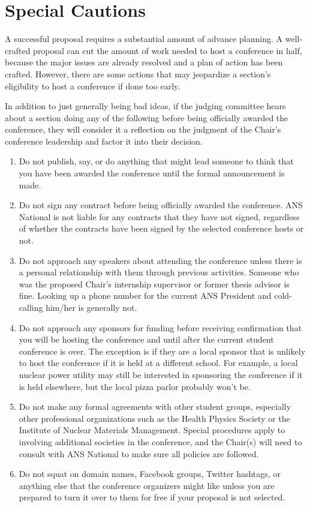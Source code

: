 \documentclass[12pt]{article}
\begin{document}
\section{Special Cautions}\label{sec:special_cautions}
A successful proposal requires a substantial amount of advance planning. A well-crafted proposal can cut the amount of work needed to host a conference in half, because the major issues are already resolved and a plan of action has been crafted. 
However, there are some actions that may jeopardize a section's eligibility to host a conference if done too early.

In addition to just generally being bad ideas, if the judging committee hears about a section doing any of the following before being officially awarded the conference, they will consider it a reflection on the judgment of the Chair's conference leadership and factor it into their decision.

\begin{enumerate}
\item{Do not publish, say, or do anything that might lead someone to think that you have been awarded the conference until the formal announcement is made.}
\item{Do not sign any contract before being officially awarded the conference. ANS National is not liable for any contracts that they have not signed, regardless of whether the contracts have been signed by the selected conference hosts or not.}
\item{Do not approach any speakers about attending the conference unless there is a personal relationship with them through previous activities. Someone who was the proposed Chair’s internship supervisor or former thesis advisor is fine. Looking up a phone number for the current ANS President and cold-calling him/her is generally not.}
\item{Do not approach any sponsors for funding before receiving confirmation that you will be hosting the conference and until after the current student conference is over. The exception is if they are a local sponsor that is unlikely to host the conference if it is held at a different school. For example, a local nuclear power utility may still be interested in sponsoring the conference if it is held elsewhere, but the local pizza parlor probably won't be.}
\item{Do not make any formal agreements with other student groups, especially other
professional organizations such as the Health Physics Society or the Institute of
Nuclear Materials Management. Special procedures apply to involving additional societies in the conference, and the Chair(s) will need to consult with ANS
National to make sure all policies are followed.}
\item{Do not squat on domain names, Facebook groups, Twitter hashtags, or anything
else that the conference organizers might like unless you are prepared to turn it
over to them for free if your proposal is not selected.}
\end{enumerate}
\end{document}
